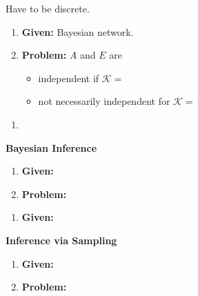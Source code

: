 \begin{warning}
    Have to be discrete. 
\end{warning}
\newpage

\begin{example}
    \begin{enumerate}
        \item \textbf{Given:} Bayesian network.
        \item \textbf{Problem:} $A$ and $E$ are 
        \begin{itemize}
            \item independent if $\mathcal{K}=$
            \item not necessarily independent for $\mathcal{K}=$
        \end{itemize}
    \end{enumerate}
\end{example}

\begin{process}
    \begin{enumerate}
        \item 
    \end{enumerate}
\end{process}

\begin{example} \textbf{Bayesian Inference}
    \begin{enumerate}
        \item \textbf{Given:}
        \item \textbf{Problem:}
    \end{enumerate}
\end{example}

\begin{process}
    \begin{enumerate}
        \item \textbf{Given:} 
    \end{enumerate}
\end{process}

\begin{example} \textbf{Inference via Sampling}
    \begin{enumerate}
        \item \textbf{Given:}
        \item \textbf{Problem:}
    \end{enumerate}
\end{example}

